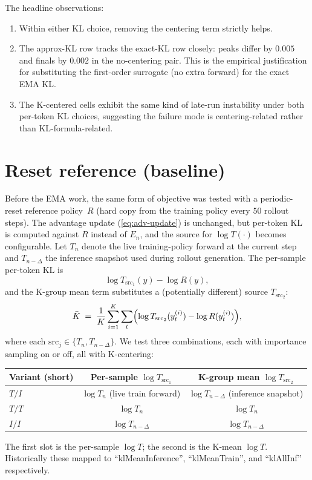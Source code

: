 \documentclass[11pt]{amsart}
\newcommand{\Tn}{T_n}
\newcommand{\En}{E_n}
\newcommand{\Tinf}{T_{n-\Delta}}
\begin{document}
The headline observations:
\begin{enumerate}
  \item Within either KL choice, removing the centering term strictly helps.
  \item The approx-KL row tracks the exact-KL row closely: peaks differ by $0.005$ and finals by $0.002$ in the no-centering pair. This is the empirical justification for substituting the first-order surrogate (no extra forward) for the exact EMA KL.
  \item The K-centered cells exhibit the same kind of late-run instability under both per-token KL choices, suggesting the failure mode is centering-related rather than KL-formula-related.
\end{enumerate}

\section{Reset reference (baseline)}

Before the EMA work, the same form of objective was tested with a periodic-reset reference policy~$R$ (hard copy from the training policy every $50$ rollout steps). The advantage update (\ref{eq:adv-update}) is unchanged, but per-token KL is computed against $R$ instead of $\En$, and the source for $\log T(\cdot)$ becomes configurable. Let $\Tn$ denote the live training-policy forward at the current step and $\Tinf$ the inference snapshot used during rollout generation. The per-sample per-token KL is
\begin{equation}\label{eq:reset-persample}
    \log T_{\text{src}_1}(y) - \log R(y),
\end{equation}
and the K-group mean term substitutes a (potentially different) source $T_{\text{src}_2}$:
\begin{equation}\label{eq:reset-kmean}
    \bar{K} \;=\; \frac{1}{K}\sum_{i=1}^K \sum_t \Bigl(\log T_{\text{src}_2}(y^{(i)}_t) - \log R(y^{(i)}_t)\Bigr),
\end{equation}
where each $\text{src}_j \in \{\Tn, \Tinf\}$. We test three combinations, each with importance sampling on or off, all with K-centering:

\begin{center}
\begin{tabular}{lcc}
\toprule
Variant (short) & Per-sample $\log T_{\text{src}_1}$ & K-group mean $\log T_{\text{src}_2}$ \\
\midrule
$T/I$ & $\log\Tn$ (live train forward) & $\log\Tinf$ (inference snapshot) \\
$T/T$ & $\log\Tn$ & $\log\Tn$ \\
$I/I$ & $\log\Tinf$ & $\log\Tinf$ \\
\bottomrule
\end{tabular}
\end{center}
The first slot is the per-sample $\log T$; the second is the K-mean $\log T$. Historically these mapped to ``klMeanInference'', ``klMeanTrain'', and ``klAllInf'' respectively.
\end{document}
